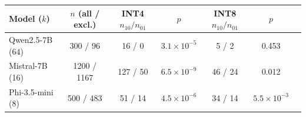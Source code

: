 \begin{tabular}{lcccccc}
\toprule
Model ($k$) & $n$ (all / excl.) & INT4 $n_{10}/n_{01}$ & $p$ & INT8 $n_{10}/n_{01}$ & $p$ \\
\midrule
Qwen2.5-7B (64) & 300 / 96 & 16 / 0 & $3.1\times10^{-5}$ & 5 / 2 & 0.453 \\
Mistral-7B (16) & 1200 / 1167 & 127 / 50 & $6.5\times10^{-9}$ & 46 / 24 & 0.012 \\
Phi-3.5-mini (8) & 500 / 483 & 51 / 14 & $4.5\times10^{-6}$ & 34 / 14 & $5.5\times10^{-3}$ \\
\bottomrule
\end{tabular}
